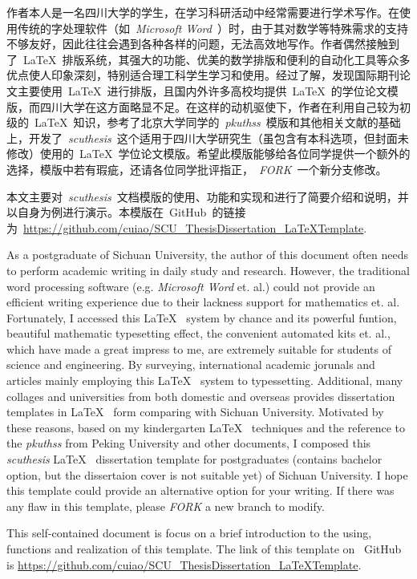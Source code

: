 \begin{CHSabstract}
	作者本人是一名四川大学的学生，在学习科研活动中经常需要进行学术写作。在使用传统的字处理软件（如~\emph{Microsoft\textsuperscript{\textregistered} Word}~）时，由于其对数学等特殊需求的支持不够友好，因此往往会遇到各种各样的问题，无法高效地写作。作者偶然接触到了~\LaTeX~排版系统，其强大的功能、优美的数学排版和便利的自动化工具等众多优点使人印象深刻，特别适合理工科学生学习和使用。经过了解，发现国际期刊论文主要使用~\LaTeX~进行排版，且国内外许多高校均提供~\LaTeX~的学位论文模版，而四川大学在这方面略显不足。在这样的动机驱使下，作者在利用自己较为初级的~\LaTeX~知识，参考了北京大学同学的~\emph{pkuthss}~模版和其他相关文献的基础上，开发了~\emph{scuthesis}~这个适用于四川大学研究生（虽包含有本科选项，但封面未修改）使用的~\LaTeX~学位论文模版。希望此模版能够给各位同学提供一个额外的选择，模版中若有瑕疵，还请各位同学批评指正，~\emph{FORK}~一个新分支修改。


	本文主要对~\emph{scuthesis}~文档模版的使用、功能和实现和进行了简要介绍和说明，并以自身为例进行演示。本模版在~GitHub~的链接为~\url{https://github.com/cuiao/SCU_ThesisDissertation_LaTeXTemplate}.
\end{CHSabstract}
\begin{ENGabstract}
	As a postgraduate of Sichuan University, the author of this document often needs to perform academic writing in daily study and research. However, the traditional word processing software (e.g. \emph{Microsoft\textsuperscript{\textregistered} Word} et. al.) could not provide an efficient writing experience due to their lackness support for mathematics et. al. Fortunately, I accessed this \LaTeX~ system by chance and its powerful funtion, beautiful mathematic typesetting effect, the convenient automated kits et. al., which have made a great impress to me, are extremely suitable for students of science and engineering. By surveying, international academic jorunals and articles mainly employing this \LaTeX~ system to typessetting. Additional, many collages and universities from both domestic and overseas provides dissertation templates in \LaTeX~ form comparing with Sichuan University. Motivated by these reasons, based on my kindergarten \LaTeX~ techniques and the reference to the \emph{pkuthss} from Peking University and other documents, I composed this \emph{scuthesis} \LaTeX~ dissertation template for postgraduates (contains bachelor option, but the dissertaion cover is not suitable yet) of Sichuan University. I hope this template could provide an alternative option for your writing. If there was any flaw in this template, please \emph{FORK} a new branch to modify.


	This self-contained document is focus on a brief introduction to the using, functions and realization of this template. The link of this template on ~GitHub~ is \url{https://github.com/cuiao/SCU_ThesisDissertation_LaTeXTemplate}.
\end{ENGabstract}
